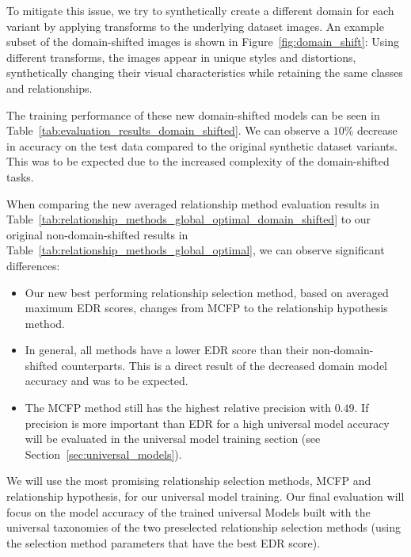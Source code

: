 To mitigate this issue, we try to synthetically create a different domain for each variant by applying transforms to the
underlying dataset images.
An example subset of the domain-shifted images is shown in Figure~\ref{fig:domain_shift}:
Using different transforms, the images appear in unique styles and distortions,
synthetically changing their visual characteristics
while retaining the same classes and relationships.




The training performance of these new domain-shifted models can be seen in Table~\ref{tab:evaluation_results_domain_shifted}.
We can observe a $10\%$ decrease in accuracy on the test data compared to the original synthetic dataset variants.
This was to be expected due to the increased complexity of the domain-shifted tasks.

When comparing the new averaged relationship method evaluation results in Table~\ref{tab:relationship_methods_global_optimal_domain_shifted}
to our original non-domain-shifted results in Table~\ref{tab:relationship_methods_global_optimal},
we can observe significant differences:

\begin{itemize}
      \item Our new best performing relationship selection method,
            based on averaged maximum EDR scores, changes from MCFP to the relationship hypothesis method.
      \item In general, all methods have a lower EDR score than their non-domain-shifted counterparts.
            This is a direct result of the decreased domain model accuracy and was to be expected.
      \item The MCFP method still has the highest relative precision with $0.49$.
            If precision is more important than EDR for a high universal model accuracy
            will be evaluated in the universal model training section (see Section~\ref{sec:universal_models}).
\end{itemize}

We will use the most promising relationship selection methods,
MCFP and relationship hypothesis, for our universal model training.
Our final evaluation will focus on the model accuracy of the trained universal Models
built with the universal taxonomies of the two preselected relationship selection methods
(using the selection method parameters that have the best EDR score).

